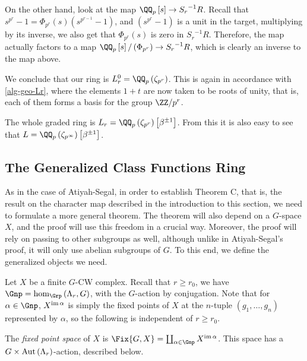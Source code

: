 \begin{example}
	On the other hand, look at the map $\QQ_p\left[s\right] \to {S_r}^{-1} R$.
	Recall that $s^{p^r} - 1 = \Phi_{p^r}\left(s\right) \left(s^{p^{r-1}} - 1\right)$, and $\left(s^{p^r} - 1\right)$ is a unit in the target, multiplying by its inverse, we also get that $\Phi_{p^r}\left(s\right)$ is zero in ${S_r}^{-1} R$.
	Therefore, the map actually factors to a map $\QQ_p\left[s\right]/\left(\Phi_{p^r}\right) \to {S_r}^{-1} R$, which is clearly an inverse to the map above.
	
	We conclude that our ring is $L_r^0 = \QQ_p\left(\zeta_{p^r}\right)$.
	This is again in accordance with \ref{alg-geo-Lr}, where the elements $1+t$ are now taken to be roots of unity, that is, each of them forms a basis for the group $\ZZ/p^r$.
	
	The whole graded ring is $L_r = \QQ_p\left(\zeta_{p^r}\right)\left[\beta^{\pm 1}\right]$.
	From this it is also easy to see that $L = \QQ_p\left(\zeta_{p^\infty}\right)\left[\beta^{\pm 1}\right]$.
\end{example}



\subsection{The Generalized Class Functions Ring}

As in the case of Atiyah-Segal, in order to establish Theorem C, that is, the result on the character map described in the introduction to this section, we need to formulate a more general theorem.
The theorem will also depend on a $G$-space $X$, and the proof will use this freedom in a crucial way.
Moreover, the proof will rely on passing to other subgroups as well, although unlike in Atiyah-Segal's proof, it will only use abelian subgroups of $G$.
To this end, we define the generalized objects we need.

Let $X$ be a finite $G$-CW complex.
Recall that $r \geq r_0$, we have $\Gnp = \hom_{\Grp}\left(\Lambda_r, G\right)$, with the $G$-action by conjugation.
Note that for $\alpha \in \Gnp$, $X^{\operatorname{im} \alpha}$ is simply the fixed points of $X$ at the $n$-tuple $\left(g_1, \dotsc, g_n\right)$ represented by $\alpha$, so the following is independent of $r \geq r_0$.

\begin{definition}
	The \emph{fixed point space} of $X$ is $\Fix{G,X} = \coprod_{\alpha \in \Gnp} X^{\im \alpha}$.
	This space has a $G \times \operatorname{Aut} \left(\Lambda_r\right)$-action, described below.
\end{definition}

